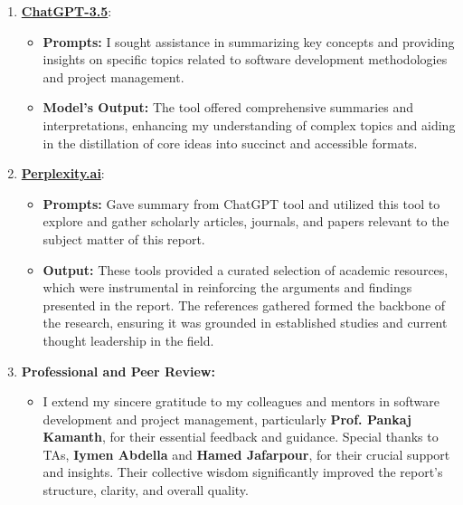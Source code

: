 \documentclass{article}
\begin{document}
\begin{enumerate}
  \item \textbf{\href{https://www.openai.com/chatgpt}{ChatGPT-3.5}}: 
  \begin{itemize}
    \item \textbf{Prompts:} I sought assistance in summarizing key concepts and providing insights on specific topics related to software development methodologies and project management.
    \item \textbf{Model’s Output:} The tool offered comprehensive summaries and interpretations, enhancing my understanding of complex topics and aiding in the distillation of core ideas into succinct and accessible formats.
  \end{itemize}
  
  \item \textbf{\href{https://www.perplexity.ai/}{Perplexity.ai}}:
  \begin{itemize}
    \item \textbf{Prompts:} Gave summary from ChatGPT tool and utilized this tool to explore and gather scholarly articles, journals, and papers relevant to the subject matter of this report.
    \item \textbf{Output:} These tools provided a curated selection of academic resources, which were instrumental in reinforcing the arguments and findings presented in the report. The references gathered formed the backbone of the research, ensuring it was grounded in established studies and current thought leadership in the field.
  \end{itemize}

  \item \textbf{Professional and Peer Review:}
 \begin{itemize}
  \item I extend my sincere gratitude to my colleagues and mentors in software development and project management, particularly \textbf{Prof. Pankaj Kamanth}, for their essential feedback and guidance. Special thanks to TAs, \textbf{Iymen Abdella} and \textbf{Hamed Jafarpour}, for their crucial support and insights. Their collective wisdom significantly improved the report's structure, clarity, and overall quality.

\end{itemize}
\end{enumerate}
\end{document}
